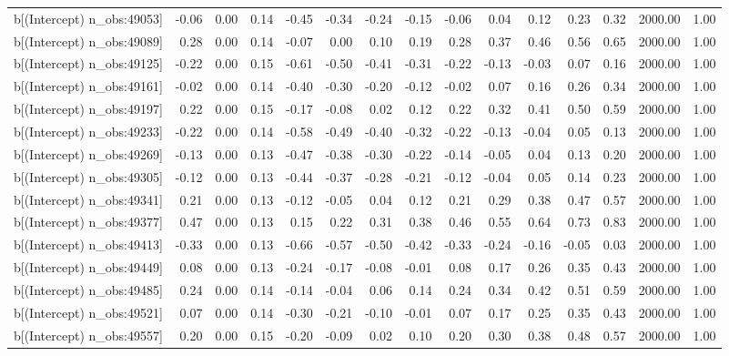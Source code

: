 \begin{table}[ht]
\begin{tabular}{rrrrrrrrrrrrrrr}
  b[(Intercept) n\_obs:49053] & -0.06 & 0.00 & 0.14 & -0.45 & -0.34 & -0.24 & -0.15 & -0.06 & 0.04 & 0.12 & 0.23 & 0.32 & 2000.00 & 1.00 \\ 
  b[(Intercept) n\_obs:49089] & 0.28 & 0.00 & 0.14 & -0.07 & 0.00 & 0.10 & 0.19 & 0.28 & 0.37 & 0.46 & 0.56 & 0.65 & 2000.00 & 1.00 \\ 
  b[(Intercept) n\_obs:49125] & -0.22 & 0.00 & 0.15 & -0.61 & -0.50 & -0.41 & -0.31 & -0.22 & -0.13 & -0.03 & 0.07 & 0.16 & 2000.00 & 1.00 \\ 
  b[(Intercept) n\_obs:49161] & -0.02 & 0.00 & 0.14 & -0.40 & -0.30 & -0.20 & -0.12 & -0.02 & 0.07 & 0.16 & 0.26 & 0.34 & 2000.00 & 1.00 \\ 
  b[(Intercept) n\_obs:49197] & 0.22 & 0.00 & 0.15 & -0.17 & -0.08 & 0.02 & 0.12 & 0.22 & 0.32 & 0.41 & 0.50 & 0.59 & 2000.00 & 1.00 \\ 
  b[(Intercept) n\_obs:49233] & -0.22 & 0.00 & 0.14 & -0.58 & -0.49 & -0.40 & -0.32 & -0.22 & -0.13 & -0.04 & 0.05 & 0.13 & 2000.00 & 1.00 \\ 
  b[(Intercept) n\_obs:49269] & -0.13 & 0.00 & 0.13 & -0.47 & -0.38 & -0.30 & -0.22 & -0.14 & -0.05 & 0.04 & 0.13 & 0.20 & 2000.00 & 1.00 \\ 
  b[(Intercept) n\_obs:49305] & -0.12 & 0.00 & 0.13 & -0.44 & -0.37 & -0.28 & -0.21 & -0.12 & -0.04 & 0.05 & 0.14 & 0.23 & 2000.00 & 1.00 \\ 
  b[(Intercept) n\_obs:49341] & 0.21 & 0.00 & 0.13 & -0.12 & -0.05 & 0.04 & 0.12 & 0.21 & 0.29 & 0.38 & 0.47 & 0.57 & 2000.00 & 1.00 \\ 
  b[(Intercept) n\_obs:49377] & 0.47 & 0.00 & 0.13 & 0.15 & 0.22 & 0.31 & 0.38 & 0.46 & 0.55 & 0.64 & 0.73 & 0.83 & 2000.00 & 1.00 \\ 
  b[(Intercept) n\_obs:49413] & -0.33 & 0.00 & 0.13 & -0.66 & -0.57 & -0.50 & -0.42 & -0.33 & -0.24 & -0.16 & -0.05 & 0.03 & 2000.00 & 1.00 \\ 
  b[(Intercept) n\_obs:49449] & 0.08 & 0.00 & 0.13 & -0.24 & -0.17 & -0.08 & -0.01 & 0.08 & 0.17 & 0.26 & 0.35 & 0.43 & 2000.00 & 1.00 \\ 
  b[(Intercept) n\_obs:49485] & 0.24 & 0.00 & 0.14 & -0.14 & -0.04 & 0.06 & 0.14 & 0.24 & 0.34 & 0.42 & 0.51 & 0.59 & 2000.00 & 1.00 \\ 
  b[(Intercept) n\_obs:49521] & 0.07 & 0.00 & 0.14 & -0.30 & -0.21 & -0.10 & -0.01 & 0.07 & 0.17 & 0.25 & 0.35 & 0.43 & 2000.00 & 1.00 \\ 
  b[(Intercept) n\_obs:49557] & 0.20 & 0.00 & 0.15 & -0.20 & -0.09 & 0.02 & 0.10 & 0.20 & 0.30 & 0.38 & 0.48 & 0.57 & 2000.00 & 1.00 \\ 

\end{tabular}
\end{table}
